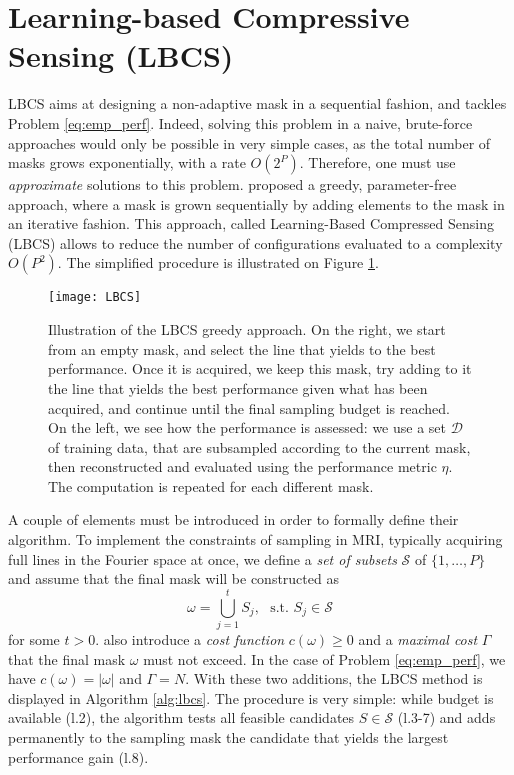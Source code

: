 \section{Learning-based Compressive Sensing (LBCS)}\label{sec:LBCS_baran}
LBCS aims at designing a non-adaptive mask in a sequential fashion, and tackles Problem \ref{eq:emp_perf}. Indeed, solving this problem in a naive, brute-force approaches would only be possible in very simple cases, as the total number of masks grows exponentially, with a rate $O(2^P)$. Therefore, one must use \textit{approximate} solutions to this problem. \citet{gozcu2018learning} proposed a greedy, parameter-free approach, where a mask is grown sequentially by adding elements to the mask in an iterative fashion. This approach, called Learning-Based Compressed Sensing (LBCS) allows to reduce the number of configurations evaluated to a complexity $O(P^2)$. The simplified procedure is illustrated on Figure \ref{fig:lbcs}.

\begin{figure}[!ht]
    \centering
    \texttt{[image: LBCS]}
    \caption{Illustration of the LBCS greedy approach. On the right, we start from an empty mask, and select the line that yields to the best performance. Once it is acquired, we keep this mask, try adding to it the line that yields the best performance given what has been acquired, and continue until the final sampling budget is reached. On the left, we see how the performance is assessed: we use a set $\mathcal{D}$ of training data, that are subsampled according to the current mask, then reconstructed and evaluated using the performance metric $\eta$. The computation is repeated for each different mask.}\label{fig:lbcs}
\end{figure}

A couple of elements must be introduced in order to formally define their algorithm. To implement the constraints of sampling in MRI, typically acquiring full lines in the Fourier space at once, we define a \textit{set of subsets} $\mathcal{S}$ of $\{1, \ldots, P\}$ and assume that the final mask will be constructed as 
\begin{equation}
    \omega = \bigcup_{j=1}^t S_j, \text{~~s.t.~} S_j \in \mathcal{S}
\end{equation}
for some $t>0$. \citet{gozcu2018learning} also introduce a \textit{cost function} $c(\omega)\geq 0$ and a \textit{maximal cost} $\Gamma$ that the final mask $\omega$ must not exceed. In the case of Problem \ref{eq:emp_perf}, we have $c(\omega) = |\omega|$ and $\Gamma = N$. With these two additions, the LBCS method \citep{gozcu2018learning} is displayed in Algorithm \ref{alg:lbcs}. The procedure is very simple: while budget is available (l.2), the algorithm tests all feasible candidates $S\in \mathcal{S}$ (l.3-7) and adds permanently to the sampling mask the candidate that yields the largest performance gain (l.8). 

